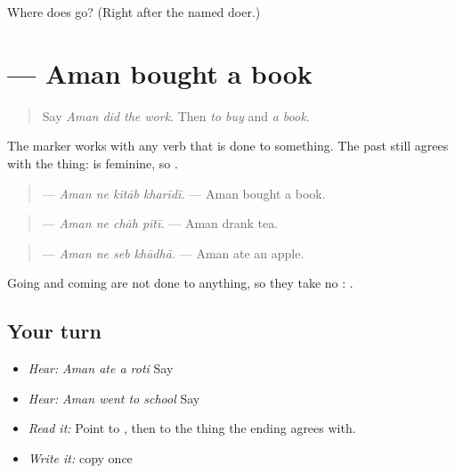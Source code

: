 \begin{tcolorbox}[breakable,colback=teal!4,colframe=teal!35!black,title={Before you move on}]
Where does \textbf{} go? (Right after the named doer.)
\end{tcolorbox}
\section[\texorpdfstring{\pa{ਅਮਨ} \pa{ਨੇ} \pa{ਕਿਤਾਬ} \pa{ਖ਼ਰੀਦੀ।} (Aman ne kitāb …)}{ਅਮਨ ਨੇ ਕਿਤਾਬ ਖ਼ਰੀਦੀ। (Aman ne kitāb …)}]{    — Aman bought a book}

\label{lesson:PA-C220-aman-ne}



\begin{quote}
Say \emph{Aman did the work}. Then \emph{to buy} and \emph{a book}.
\end{quote}

\begin{grammarlens}[title={Grammar Lens: \pa{ਨੇ} beyond the work}]
The marker works with any verb that is done to something. The past still agrees with the thing: \textbf{} is feminine, so \textbf{}.

\begin{quote}
\textbf{   } — \emph{Aman ne kitāb kharīdī.} — Aman bought a book.
\end{quote}

\begin{quote}
\textbf{   } — \emph{Aman ne chāh pītī.} — Aman drank tea.
\end{quote}

\begin{quote}
\textbf{   } — \emph{Aman ne seb khādhā.} — Aman ate an apple.
\end{quote}

Going and coming are not done to anything, so they take no \textbf{}: \textbf{  }.
\end{grammarlens}

\subsection*{Your turn}
\begin{itemize}
\raggedright
  \item \emph{Hear:} \emph{Aman ate a roti} Say \textbf{   }
  \item \emph{Hear:} \emph{Aman went to school} Say \textbf{  }
  \item \emph{Read it:} \textbf{   } Point to \textbf{}, then to the thing the ending agrees with.
  \item \emph{Write it:} copy \textbf{   } once
\end{itemize}


